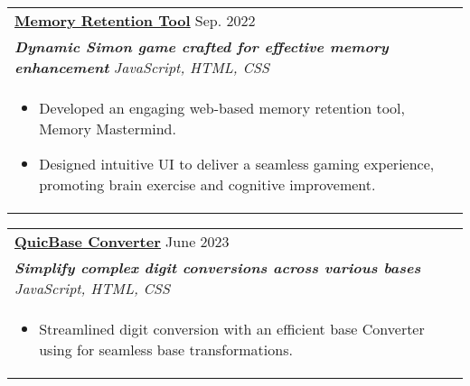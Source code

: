 \documentclass[a4paper,8pt]{article}
\begin{document}
\begin{tabularx}{\linewidth}{ @{}l r@{} }
\color[HTML]{1C033C} \textbf{\uline{\href{https://github.com/}{Memory Retention Tool}}} \hfill \color[HTML]{371e77} Sep. 2022 \\[4pt]
\color[HTML]{371e77}\textbf{\textit{Dynamic Simon game crafted for effective memory enhancement}} \hfill \color[HTML]{4B28A4} \textit{JavaScript, HTML, CSS} \\[5pt]
\begin{minipage}[t]{\linewidth}
    \begin{itemize}[nosep,after=\strut, leftmargin=2em, itemsep=2pt]
        \item Developed an engaging web-based memory retention tool, Memory Mastermind.
        \item Designed intuitive UI to deliver a seamless gaming experience, promoting brain exercise and cognitive improvement.
    \end{itemize}
    \end{minipage}
\end{tabularx}

\begin{tabularx}{\linewidth}{ @{}l r@{} }
\color[HTML]{1C033C} \textbf{\uline{\href{https://github.com/}{QuicBase Converter}}} \hfill \color[HTML]{371e77} June 2023 \\[4pt]
\color[HTML]{371e77}\textbf{\textit{Simplify complex digit conversions across various bases}} \hfill \color[HTML]{4B28A4} \textit{JavaScript, HTML, CSS} \\[5pt]
\begin{minipage}[t]{\linewidth}
    \begin{itemize}[nosep,after=\strut, leftmargin=2em, itemsep=2pt]
        \item Streamlined digit conversion with an efficient base Converter using for seamless base transformations.
    \end{itemize}
    \end{minipage}
\end{tabularx}

\end{document}
